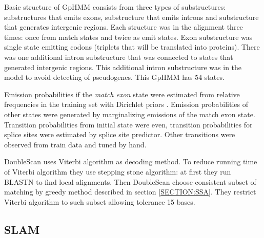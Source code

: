 Basic structure of GpHMM consists from three types of substructures:
substructures that emits exons, substructure that emits introns and substructure
that generates intergenic regions. Each structure was in the alignment three
times: once from match states and twice as emit states. Exon substructure was
single state emitting codons (triplets that will be translated into proteins).
There was one additional intron substructure that was connected to states that
generated intergenic regions. This additional intron substructure was in the
model to avoid detecting of pseudogenes. This GpHMM has $54$ states.

\nocite{Meyer2002}

Emission probabilities if the {\it match exon} state were estimated from
relative frequencies in the training set with Dirichlet priors
\cite{Meyer2002,Durbin1998}.  Emission probabilities of other states were
generated  by marginalizing emissions of the match exon state. Transition
probabilities from initial state were even, transition probabilities for splice
sites were estimated by splice site predictor. Other transitions were observed
from train data and tuned by hand.

DoubleScan uses Viterbi algorithm as decoding method.  To reduce running time of
Viterbi algorithm they use stepping stone algorithm: at first they run BLASTN to
find local alignments. Then DoubleScan choose consistent subset of matching by
greedy method described in section \ref{SECTION:SSA}. They restrict Viterbi
algorithm to such subset allowing tolerance 15 bases.

\subsection{SLAM} 

